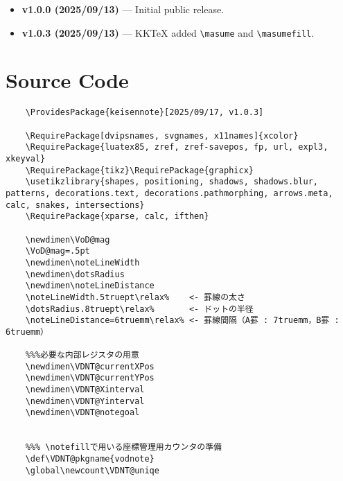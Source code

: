 \documentclass[a4paper,12pt]{article}
\begin{document}
\begin{itemize}
    \item \textbf{v1.0.0 (2025/09/13)} --- Initial public release.
    \item \textbf{v1.0.3 (2025/09/13)} --- KKTeX added \texttt{\textbackslash masume} and \texttt{\textbackslash masumefill}.
\end{itemize}

\section{Source Code}
  \begin{lstlisting}
    \ProvidesPackage{keisennote}[2025/09/17, v1.0.3]

    \RequirePackage[dvipsnames, svgnames, x11names]{xcolor}
    \RequirePackage{luatex85, zref, zref-savepos, fp, url, expl3, xkeyval}
    \RequirePackage{tikz}\RequirePackage{graphicx}
    \usetikzlibrary{shapes, positioning, shadows, shadows.blur, patterns, decorations.text, decorations.pathmorphing, arrows.meta, calc, snakes, intersections}
    \RequirePackage{xparse, calc, ifthen}

    \newdimen\VoD@mag
    \VoD@mag=.5pt 
    \newdimen\noteLineWidth
    \newdimen\dotsRadius
    \newdimen\noteLineDistance
    \noteLineWidth.5truept\relax%    <- 罫線の太さ
    \dotsRadius.8truept\relax%       <- ドットの半径
    \noteLineDistance=6truemm\relax% <- 罫線間隔（A罫 : 7truemm，B罫 : 6truemm） 

    %%%必要な内部レジスタの用意
    \newdimen\VDNT@currentXPos
    \newdimen\VDNT@currentYPos
    \newdimen\VDNT@Xinterval
    \newdimen\VDNT@Yinterval
    \newdimen\VDNT@notegoal


    %%% \notefillで用いる座標管理用カウンタの準備
    \def\VDNT@pkgname{vodnote}
    \global\newcount\VDNT@uniqe



\end{lstlisting}
\end{document}
